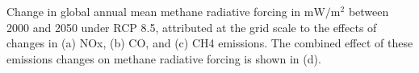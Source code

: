 Change in global annual mean methane radiative forcing in $\mathrm{mW/m^2}$ between 2000 and 2050 under RCP 8.5, attributed at the grid scale to the effects of changes in (a) NOx, (b) CO, and (c) CH4 emissions. The combined effect of these emissions changes on methane radiative forcing is shown in (d).~\label{fig:drfcomb85}